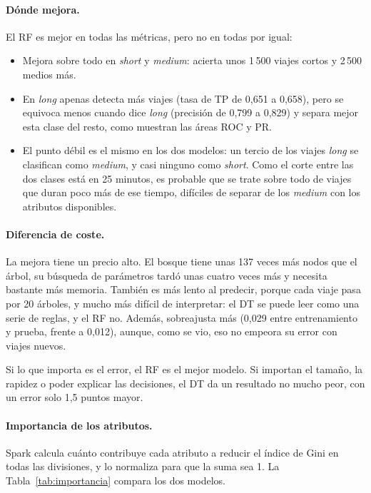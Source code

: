 \documentclass[12pt,a4paper]{article}
\begin{document}
\paragraph{Dónde mejora.} El \ac{RF} es mejor en todas las métricas, pero
no en todas por igual:
\begin{itemize}
    \item Mejora sobre todo en \textit{short} y \textit{medium}: acierta
    unos 1\,500 viajes cortos y 2\,500 medios más.
    \item En \textit{long} apenas detecta más viajes (tasa de \acs{TP} de
    0,651 a 0,658), pero se equivoca menos cuando dice \textit{long}
    (precisión de 0,799 a 0,829) y separa mejor esta clase del resto, como
    muestran las áreas \acs{ROC} y \acs{PR}.
    \item El punto débil es el mismo en los dos modelos: un tercio de los
    viajes \textit{long} se clasifican como \textit{medium}, y casi ninguno
    como \textit{short}. Como el corte entre las dos clases está en 25
    minutos, es probable que se trate sobre todo de viajes que duran poco
    más de ese tiempo, difíciles de separar de los \textit{medium} con los
    atributos disponibles.
\end{itemize}

\paragraph{Diferencia de coste.} La mejora tiene un precio alto. El bosque tiene
unas 137 veces más nodos que el árbol, su búsqueda de parámetros tardó
unas cuatro veces más y necesita bastante más memoria. También es más
lento al predecir, porque cada viaje pasa por 20 árboles, y mucho más
difícil de interpretar: el \ac{DT} se puede leer como una serie de reglas,
y el \ac{RF} no. Además, sobreajusta más (0,029 entre entrenamiento y
prueba, frente a 0,012), aunque, como se vio, eso no empeora su error con
viajes nuevos.

Si lo que importa es el error, el \ac{RF} es el mejor modelo. Si importan
el tamaño, la rapidez o poder explicar las decisiones, el \ac{DT} da un
resultado no mucho peor, con un error solo 1,5 puntos mayor.

\paragraph{Importancia de los atributos.} Spark calcula cuánto contribuye
cada atributo a reducir el índice de Gini en todas las divisiones, y lo
normaliza para que la suma sea 1. La Tabla~\ref{tab:importancia} compara
los dos modelos.
\end{document}
